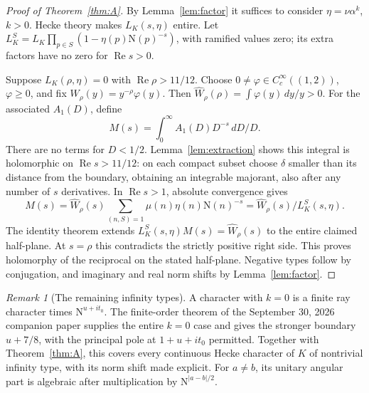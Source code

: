 \documentclass[11pt,a4paper]{article}
\numberwithin{equation}{section}
\theoremstyle{definition}
\theoremstyle{remark}
\newtheorem{remark}[theorem]{Remark}
\newcommand{\N}{\mathrm N}
\newcommand{\dd}{\,d}
\newcommand{\Rea}{\operatorname{Re}}
\newcommand{\wt}{\widehat}
\begin{document}
\begin{proof}[Proof of Theorem~\ref{thm:A}]
By Lemma~\ref{lem:factor} it suffices to consider $\eta=\nu\alpha^k$, $k>0$. Hecke theory makes $L_K(s,\eta)$ entire. Let $L_K^S=L_K\prod_{p\in S}(1-\eta(p)\N(p)^{-s})$, with ramified values zero; its extra factors have no zero for $\Rea s>0$.

Suppose $L_K(\rho,\eta)=0$ with $\Rea\rho>11/12$. Choose $0\ne\varphi\in C_c^\infty((1,2))$, $\varphi\ge0$, and fix $W_\rho(y)=y^{-\rho}\varphi(y)$. Then $\wt W_\rho(\rho)=\int\varphi(y)\dd y/y>0$. For the associated $A_1(D)$, define
\[
 M(s)=\int_0^\infty A_1(D)D^{-s}\dd D/D.
\]
There are no terms for $D<1/2$. Lemma~\ref{lem:extraction} shows this integral is holomorphic on $\Rea s>11/12$: on each compact subset choose $\delta$ smaller than its distance from the boundary, obtaining an integrable majorant, also after any number of $s$ derivatives. In $\Rea s>1$, absolute convergence gives
\[
 M(s)=\wt W_\rho(s)\sum_{(n,S)=1}\mu(n)\eta(n)\N(n)^{-s}
 =\wt W_\rho(s)/L_K^S(s,\eta).
\]
The identity theorem extends $L_K^S(s,\eta)M(s)=\wt W_\rho(s)$ to the entire claimed half-plane. At $s=\rho$ this contradicts the strictly positive right side. This proves holomorphy of the reciprocal on the stated half-plane. Negative types follow by conjugation, and imaginary and real norm shifts by Lemma~\ref{lem:factor}.
\end{proof}

\begin{remark}[The remaining infinity types]\label{rem:radial}
A character with $k=0$ is a finite ray character times $\N^{u+it_0}$. The finite-order theorem of the September 30, 2026 companion paper \cite[Theorem 1.1]{QRH78} supplies the entire $k=0$ case and gives the stronger boundary $u+7/8$, with the principal pole at $1+u+it_0$ permitted. Together with Theorem~\ref{thm:A}, this covers every continuous Hecke character of $K$ of nontrivial infinity type, with its norm shift made explicit. For $a\ne b$, its unitary angular part is algebraic after multiplication by $\N^{|a-b|/2}$.
\end{remark}
\end{document}
